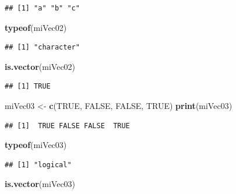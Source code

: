 \documentclass[]{book}
\newenvironment{Shaded}{\begin{snugshade}}{\end{snugshade}}
\newcommand{\KeywordTok}[1]{\textcolor[rgb]{0.13,0.29,0.53}{\textbf{#1}}}
\newcommand{\StringTok}[1]{\textcolor[rgb]{0.31,0.60,0.02}{#1}}
\newcommand{\OtherTok}[1]{\textcolor[rgb]{0.56,0.35,0.01}{#1}}
\newcommand{\NormalTok}[1]{#1}
\begin{document}
\begin{verbatim}
## [1] "a" "b" "c"
\end{verbatim}

\begin{Shaded}
\begin{Highlighting}[]
\KeywordTok{typeof}\NormalTok{(miVec02)}
\end{Highlighting}
\end{Shaded}

\begin{verbatim}
## [1] "character"
\end{verbatim}

\begin{Shaded}
\begin{Highlighting}[]
\KeywordTok{is.vector}\NormalTok{(miVec02)}
\end{Highlighting}
\end{Shaded}

\begin{verbatim}
## [1] TRUE
\end{verbatim}

\begin{Shaded}
\begin{Highlighting}[]
\NormalTok{miVec03 <-}\StringTok{ }\KeywordTok{c}\NormalTok{(}\OtherTok{TRUE}\NormalTok{, }\OtherTok{FALSE}\NormalTok{, }\OtherTok{FALSE}\NormalTok{, }\OtherTok{TRUE}\NormalTok{)}
\KeywordTok{print}\NormalTok{(miVec03)}
\end{Highlighting}
\end{Shaded}

\begin{verbatim}
## [1]  TRUE FALSE FALSE  TRUE
\end{verbatim}

\begin{Shaded}
\begin{Highlighting}[]
\KeywordTok{typeof}\NormalTok{(miVec03)}
\end{Highlighting}
\end{Shaded}

\begin{verbatim}
## [1] "logical"
\end{verbatim}

\begin{Shaded}
\begin{Highlighting}[]
\KeywordTok{is.vector}\NormalTok{(miVec03)}
\end{Highlighting}
\end{Shaded}
\end{document}
